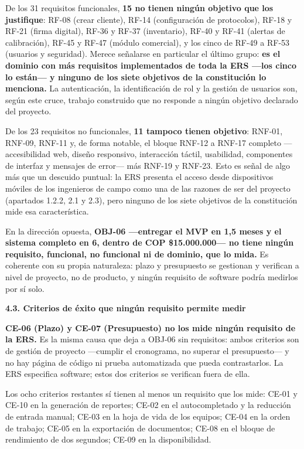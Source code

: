 \documentclass[12pt,varwidth=170mm,border=10pt]{standalone}
\newcommand{\subsectiontitle}[1]{%
  \par\vspace{1.3ex}%
  {\normalfont\large\bfseries #1\par}%
  \vspace{0.5ex}%
}
\begin{document}
De los 31 requisitos funcionales, \textbf{15 no tienen ningún objetivo que los justifique}: RF-08 (crear cliente), RF-14 (configuración de protocolos), RF-18 y RF-21 (firma digital), RF-36 y RF-37 (inventario), RF-40 y RF-41 (alertas de calibración), RF-45 y RF-47 (módulo comercial), y los cinco de RF-49 a RF-53 (usuarios y seguridad). Merece señalarse en particular el último grupo: \textbf{es el dominio con más requisitos implementados de toda la ERS —los cinco lo están— y ninguno de los siete objetivos de la constitución lo menciona.} La autenticación, la identificación de rol y la gestión de usuarios son, según este cruce, trabajo construido que no responde a ningún objetivo declarado del proyecto.

De los 23 requisitos no funcionales, \textbf{11 tampoco tienen objetivo}: RNF-01, RNF-09, RNF-11 y, de forma notable, el bloque RNF-12 a RNF-17 completo —accesibilidad web, diseño responsivo, interacción táctil, usabilidad, componentes de interfaz y mensajes de error— más RNF-19 y RNF-23. Esto es señal de algo más que un descuido puntual: la ERS presenta el acceso desde dispositivos móviles de los ingenieros de campo como una de las razones de ser del proyecto (apartados 1.2.2, 2.1 y 2.3), pero ninguno de los siete objetivos de la constitución mide esa característica.

En la dirección opuesta, \textbf{OBJ-06 —entregar el MVP en 1,5 meses y el sistema completo en 6, dentro de COP \$15.000.000— no tiene ningún requisito, funcional, no funcional ni de dominio, que lo mida.} Es coherente con su propia naturaleza: plazo y presupuesto se gestionan y verifican a nivel de proyecto, no de producto, y ningún requisito de software podría medirlos por sí solo.

\subsectiontitle{4.3. Criterios de éxito que ningún requisito permite medir}

\textbf{CE-06 (Plazo) y CE-07 (Presupuesto) no los mide ningún requisito de la ERS.} Es la misma causa que deja a OBJ-06 sin requisitos: ambos criterios son de gestión de proyecto —cumplir el cronograma, no superar el presupuesto— y no hay página de código ni prueba automatizada que pueda contrastarlos. La ERS especifica software; estos dos criterios se verifican fuera de ella.

Los ocho criterios restantes sí tienen al menos un requisito que los mide: CE-01 y CE-10 en la generación de reportes; CE-02 en el autocompletado y la reducción de entrada manual; CE-03 en la hoja de vida de los equipos; CE-04 en la orden de trabajo; CE-05 en la exportación de documentos; CE-08 en el bloque de rendimiento de dos segundos; CE-09 en la disponibilidad.
\end{document}
